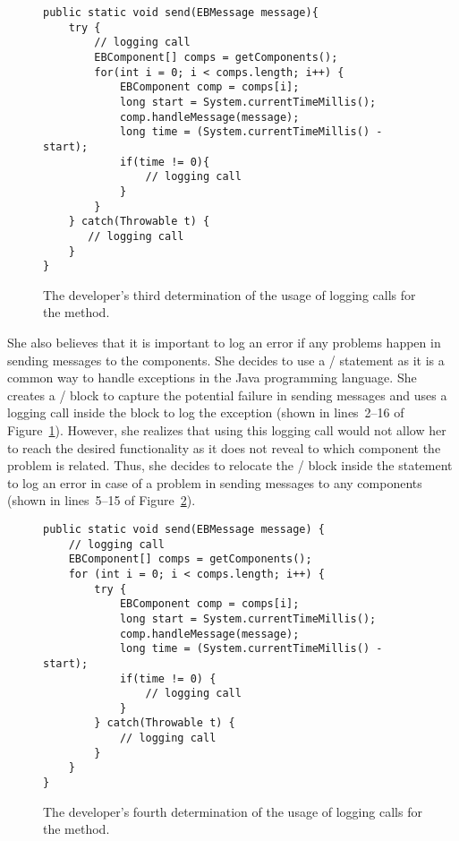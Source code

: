 \begin{figure}[p]
\def\baselinestretch{1}
\begin{lstlisting}
public static void send(EBMessage message){
    try {
        // logging call
        EBComponent[] comps = getComponents();
        for(int i = 0; i < comps.length; i++) {
            EBComponent comp = comps[i];
            long start = System.currentTimeMillis();
            comp.handleMessage(message);
            long time = (System.currentTimeMillis() - start);
            if(time != 0){
                // logging call
            }
        }
    } catch(Throwable t) {
       // logging call
    }
}
\end{lstlisting}
\caption{The developer's third determination of the usage of logging calls for the  method.\label{ch2-ex-logged-m3}}
\end{figure}

She also believes that it is important to log an error if any problems happen in sending messages to the components. She decides to use a / statement as it is a common way to handle exceptions in the Java programming language. She creates a / block to capture the potential failure in sending messages and uses a logging call inside the  block to log the exception (shown in lines~2--16 of Figure~\ref{ch2-ex-logged-m3}). However, she realizes that using this logging call would not allow her to reach the desired functionality as it does not reveal to which component the problem is related. Thus, she decides to relocate the / block inside the  statement to log an error in case of a problem in sending messages to any components (shown in lines~5--15 of Figure~\ref{ch2-ex-logged-m4}).


\begin{figure}[p]
\def\baselinestretch{1}
\begin{lstlisting}
public static void send(EBMessage message) {
    // logging call
    EBComponent[] comps = getComponents();
    for (int i = 0; i < comps.length; i++) {
        try {
            EBComponent comp = comps[i];
            long start = System.currentTimeMillis();
            comp.handleMessage(message);
            long time = (System.currentTimeMillis() - start);
            if(time != 0) {
                // logging call
            }
        } catch(Throwable t) {
            // logging call
        }
    }
}
\end{lstlisting}
\caption{The developer's fourth determination of the usage of logging calls for the  method.\label{ch2-ex-logged-m4}}
\end{figure}

